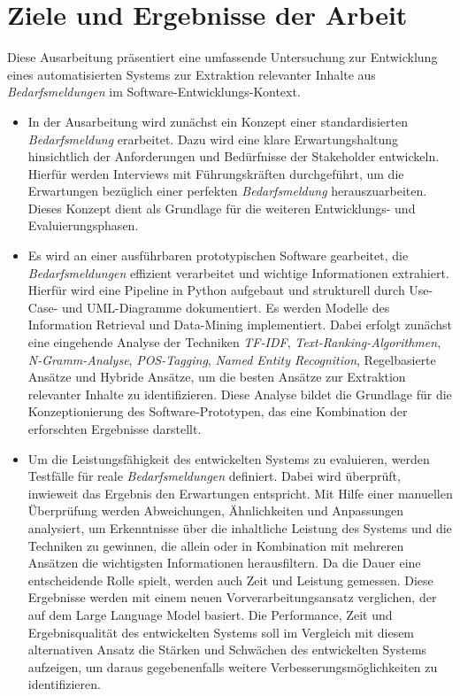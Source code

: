 \section{Ziele und Ergebnisse der Arbeit}
\label{sec:zieleundergebnis}
Diese Ausarbeitung präsentiert eine umfassende Untersuchung zur Entwicklung eines automatisierten Systems zur Extraktion relevanter Inhalte aus \emph{Bedarfsmeldungen} im Software-Entwicklungs-Kontext.
\begin{itemize}
	\item In der Ausarbeitung wird zunächst ein Konzept einer standardisierten \emph{Bedarfsmeldung} erarbeitet. Dazu wird eine klare Erwartungshaltung hinsichtlich der Anforderungen und Bedürfnisse der Stakeholder entwickeln. Hierfür werden Interviews mit Führungskräften durchgeführt, um die Erwartungen bezüglich einer \glqq{}perfekten\grqq{} \emph{Bedarfsmeldung} herauszuarbeiten. Dieses Konzept dient als Grundlage für die weiteren Entwicklungs- und Evaluierungsphasen.
	\item Es wird an einer ausführbaren prototypischen Software gearbeitet, die \emph{Bedarfsmeldungen} effizient verarbeitet und wichtige Informationen extrahiert. Hierfür wird eine Pipeline in Python aufgebaut und strukturell durch Use-Case- und UML-Diagramme dokumentiert. Es werden Modelle des Information Retrieval und Data-Mining implementiert. Dabei erfolgt zunächst eine eingehende Analyse der Techniken \emph{TF-IDF}, \emph{Text-Ranking-Algorithmen}, \emph{N-Gramm-Analyse}, \emph{POS-Tagging}, \emph{Named Entity Recognition}, Regelbasierte Ansätze und Hybride Ansätze, um die besten Ansätze zur Extraktion relevanter Inhalte zu identifizieren. Diese Analyse bildet die Grundlage für die Konzeptionierung des Software-Prototypen, das eine Kombination der erforschten Ergebnisse darstellt.
	\item Um die Leistungsfähigkeit des entwickelten Systems zu evaluieren, werden Testfälle für reale \emph{Bedarfsmeldungen} definiert. Dabei wird überprüft, inwieweit das Ergebnis den Erwartungen entspricht. Mit Hilfe einer manuellen Überprüfung werden Abweichungen, Ähnlichkeiten und Anpassungen analysiert, um Erkenntnisse über die inhaltliche Leistung des Systems und die Techniken zu gewinnen, die allein oder in Kombination mit mehreren Ansätzen die wichtigsten Informationen herausfiltern. Da die Dauer eine entscheidende Rolle spielt, werden auch Zeit und Leistung gemessen. Diese Ergebnisse werden mit einem neuen Vorverarbeitungsansatz verglichen, der auf dem Large Language Model basiert. Die Performance, Zeit und Ergebnisqualität des entwickelten Systems soll im Vergleich mit diesem alternativen Ansatz die Stärken und Schwächen des entwickelten Systems aufzeigen, um daraus gegebenenfalls weitere Verbesserungsmöglichkeiten zu identifizieren.
\end{itemize}
